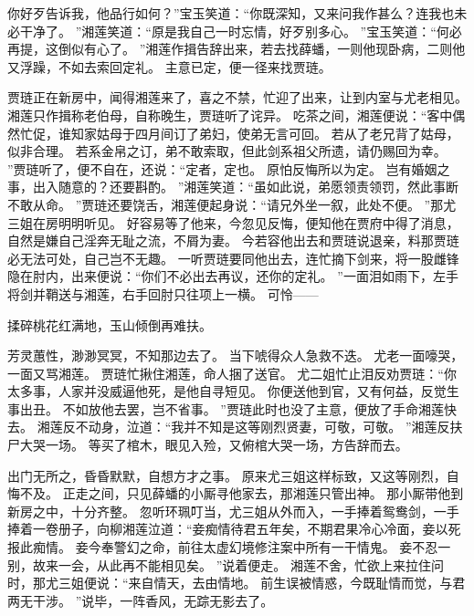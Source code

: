 你好歹告诉我，他品行如何？”宝玉笑道：“你既深知，又来问我作甚么？连我也未必干净了。
”湘莲笑道：“原是我自己一时忘情，好歹别多心。
”宝玉笑道：“何必再提，这倒似有心了。
”湘莲作揖告辞出来，若去找薛蟠，一则他现卧病，二则他又浮躁，不如去索回定礼。
主意已定，便一径来找贾琏。
\par
贾琏正在新房中，闻得湘莲来了，喜之不禁，忙迎了出来，让到内室与尤老相见。
湘莲只作揖称老伯母，自称晚生，贾琏听了诧异。
吃茶之间，湘莲便说：“客中偶然忙促，谁知家姑母于四月间订了弟妇，使弟无言可回。
若从了老兄背了姑母，似非合理。
若系金帛之订，弟不敢索取，但此剑系祖父所遗，请仍赐回为幸。
”贾琏听了，便不自在，还说：“定者，定也。
原怕反悔所以为定。
岂有婚姻之事，出入随意的？还要斟酌。
”湘莲笑道：“虽如此说，弟愿领责领罚，然此事断不敢从命。
”贾琏还要饶舌，湘莲便起身说：“请兄外坐一叙，此处不便。
”那尤三姐在房明明听见。
好容易等了他来，今忽见反悔，便知他在贾府中得了消息，自然是嫌自己淫奔无耻之流，不屑为妻。
今若容他出去和贾琏说退亲，料那贾琏必无法可处，自己岂不无趣。
一听贾琏要同他出去，连忙摘下剑来，将一股雌锋隐在肘内，出来便说：“你们不必出去再议，还你的定礼。
”一面泪如雨下，左手将剑并鞘送与湘莲，右手回肘只往项上一横。
可怜——\par
\hop
揉碎桃花红满地，玉山倾倒再难扶。
\par
{}\par
\hop
芳灵蕙性，渺渺冥冥，不知那边去了。
当下唬得众人急救不迭。
尤老一面嚎哭，一面又骂湘莲。
贾琏忙揪住湘莲，命人捆了送官。
尤二姐忙止泪反劝贾琏：“你太多事，人家并没威逼他死，是他自寻短见。
你便送他到官，又有何益，反觉生事出丑。
不如放他去罢，岂不省事。
”贾琏此时也没了主意，便放了手命湘莲快去。
湘莲反不动身，泣道：“我并不知是这等刚烈贤妻，可敬，可敬。
”湘莲反扶尸大哭一场。
等买了棺木，眼见入殓，又俯棺大哭一场，方告辞而去。
\par
出门无所之，昏昏默默，自想方才之事。
原来尤三姐这样标致，又这等刚烈，自悔不及。
正走之间，只见薛蟠的小厮寻他家去，那湘莲只管出神。
那小厮带他到新房之中，十分齐整。
忽听环珮叮当，尤三姐从外而入，一手捧着鸳鸯剑，一手捧着一卷册子，向柳湘莲泣道：“妾痴情待君五年矣，不期君果冷心冷面，妾以死报此痴情。
妾今奉警幻之命，前往太虚幻境修注案中所有一干情鬼。
妾不忍一别，故来一会，从此再不能相见矣。
”说着便走。
湘莲不舍，忙欲上来拉住问时，那尤三姐便说：“来自情天，去由情地。
前生误被情惑，今既耻情而觉，与君两无干涉。
”说毕，一阵香风，无踪无影去了。
\par
